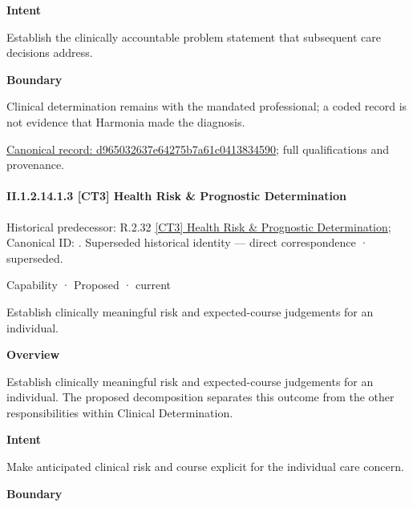 \textbf{Intent}



Establish the clinically accountable problem statement that subsequent care decisions address.



\textbf{Boundary}



Clinical determination remains with the mandated professional; a coded record is not evidence that Harmonia made the diagnosis.


{\footnotesize \href{../../../../continuum/strategy/capability/d965032637e64275b7a61c0413834590.md}{Canonical record: d965032637e64275b7a61c0413834590}; full qualifications and provenance.}\par
\paragraph*{II.1.2.14.1.3 [CT3] Health Risk \& Prognostic Determination}
\label{navigation:II.1.2.14.1.3}

{\small Historical predecessor: R.2.32 \hyperref[element:3215f0b0e1ce45e8ab16dae272ea6fe7]{[CT3] Health Risk \& Prognostic Determination}; Canonical ID: \texttt{}. Superseded historical identity — direct correspondence · superseded.}\par
\label{element:5bba0ea969814b5fa7ad11b67ab40a0c}
{\small Capability · Proposed · current}\par

Establish clinically meaningful risk and expected-course judgements for an individual.



\textbf{Overview}



Establish clinically meaningful risk and expected-course judgements for an individual. The proposed decomposition separates this outcome from the other responsibilities within Clinical Determination.



\textbf{Intent}



Make anticipated clinical risk and course explicit for the individual care concern.



\textbf{Boundary}



